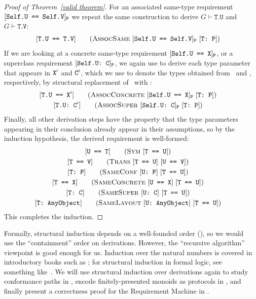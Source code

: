 \documentclass[../generics]{subfiles}
\begin{document}
\begin{proof}[Proof of Theorem~\ref*{valid theorem}]
For an associated same-type requirement $[\texttt{Self.U == Self.V}]_{\texttt{P}}$ we repeat the same construction to derive $G\vdash\texttt{T.U}$ and $G\vdash\texttt{T.V}$:
\begin{gather*}
\AssocSameStepDef
\end{gather*}
If we are looking at a concrete same-type requirement $[\texttt{Self.U == X}]_{\texttt{P}}$, or a superclass requirement $[\texttt{Self.U:~C}]_{\texttt{P}}$, we again use  to derive each type parameter that appears in $\texttt{X}'$ and $\texttt{C}'$, which we use to denote the types obtained from \tX\ and \tC, respectively, by structural replacement of \tSelf\ with \tT:
\begin{gather*}
\AssocConcreteStepDef\\
\AssocSuperStepDef
\end{gather*}
Finally, all other derivation steps have the property that the type parameters appearing in their conclusion already appear in their assumptions, so by the induction hypothesis, the derived requirement is well-formed:
\begin{gather*}
\SymStepDef\\
\TransStepDef\\
\SameConfStepDef\\
\SameConcreteStepDef\\
\SameSuperStepDef\\
\SameLayoutStepDef
\end{gather*}
This completes the induction.
\end{proof}
Formally, structural induction depends on a well-founded order (), so we would use the ``containment'' order on derivations. However, the ``recursive algorithm'' viewpoint is good enough for us. Induction over the natural numbers is covered in introductory books such as \cite{grimaldi}; for structural induction in formal logic, see something like~\cite{bradley2007calculus}. We will use structural induction over derivations again to study conformance paths in , encode finitely-presented monoids as protocols in , and finally present a correctness proof for the Requirement Machine in .

\medskip
\end{document}
